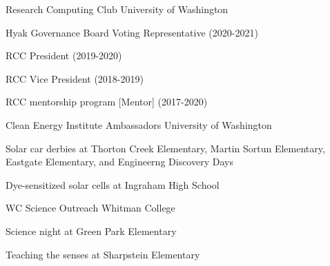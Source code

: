 


\begin{cventries}

\cventry
  {}
  {Research Computing Club} %
  {University of Washington} %
  {}
  {
    \begin{cvitems}
    \item{Hyak Governance Board Voting Representative (2020-2021)}
    \item{RCC President (2019-2020)}
    \item{RCC Vice President (2018-2019)}
    \item{RCC mentorship program [Mentor] (2017-2020)}
    \end{cvitems}
  }
   
\cventry
  {}
  {Clean Energy Institute Ambassadors} %
  {University of Washington} %
  {}
  {
    \begin{cvitems}
      \item{Solar car derbies at Thorton Creek Elementary, Martin Sortun 
	    Elementary, Eastgate Elementary, and Engineerng Discovery Days}
      \item{Dye-sensitized solar cells at Ingraham High School}
    \end{cvitems}
  }

\cventry
  {}
  {WC Science Outreach} %
  {Whitman College} %
  {}
  {
    \begin{cvitems}
      \item{Science night at Green Park Elementary}
      \item{Teaching the senses at Sharpstein Elementary}
    \end{cvitems}
  }

\end{cventries}
